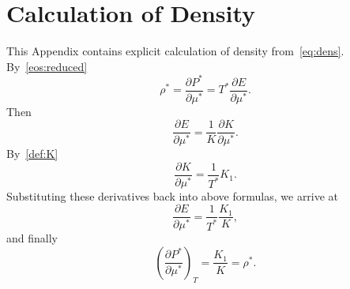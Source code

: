 \documentclass[12pt]{article}
\numberwithin{equation}{section}
\begin{document}
		
	\section{\label{sec:app:dens} Calculation of Density}
	This Appendix contains explicit calculation of density from~\eqref{eq:dens}. By~\eqref{eos:reduced}
	\begin{equation}
		\rho^* = \frac{\partial P^*}{\partial \mu^*} = T^* \frac{\partial E}{\partial \mu^*}.
	\end{equation}
	Then
	\begin{equation}
		\frac{\partial E}{\partial \mu^*} = \frac{1}{K} \frac{\partial K}{\partial \mu^*}.
	\end{equation}
	By~\eqref{def:K}
	\begin{equation}
		\frac{\partial K}{\partial \mu^*} = \frac{1}{T^*}K_1.
	\end{equation}
	Substituting these derivatives back into above formulas, we arrive at
	\begin{equation}
		\frac{\partial E}{\partial \mu^*} = \frac{1}{T^*} \frac{K_1}{K},
	\end{equation}
	and finally
	\begin{equation}
		\left(\frac{\partial P^*}{\partial \mu^*} \right)_T = \frac{K_1}{K} = \rho^*.
	\end{equation}
	
	
\end{document}
